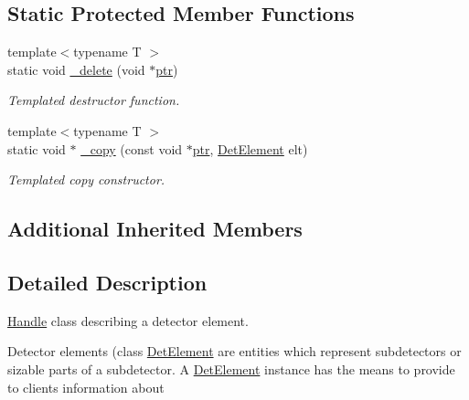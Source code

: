 \subsection*{Static Protected Member Functions}
\begin{DoxyCompactItemize}
\item 
{\footnotesize template$<$typename T $>$ }\\static void \hyperlink{class_d_d4hep_1_1_geometry_1_1_det_element_ae50e83aa675d0f3eae3cfed01a597bec}{\+\_\+delete} (void $\ast$\hyperlink{class_d_d4hep_1_1_handle_a6f165a9eec329d2d65172767b5f2777a}{ptr})
\begin{DoxyCompactList}\small\item\em Templated destructor function. \end{DoxyCompactList}\item 
{\footnotesize template$<$typename T $>$ }\\static void $\ast$ \hyperlink{class_d_d4hep_1_1_geometry_1_1_det_element_a2098e1c10dc049af5040b380d2af1983}{\+\_\+copy} (const void $\ast$\hyperlink{class_d_d4hep_1_1_handle_a6f165a9eec329d2d65172767b5f2777a}{ptr}, \hyperlink{class_d_d4hep_1_1_geometry_1_1_det_element}{Det\+Element} elt)
\begin{DoxyCompactList}\small\item\em Templated copy constructor. \end{DoxyCompactList}\end{DoxyCompactItemize}
\subsection*{Additional Inherited Members}


\subsection{Detailed Description}
\hyperlink{class_d_d4hep_1_1_handle}{Handle} class describing a detector element. 

Detector elements (class \hyperlink{class_d_d4hep_1_1_geometry_1_1_det_element}{Det\+Element} are entities which represent subdetectors or sizable parts of a subdetector. A \hyperlink{class_d_d4hep_1_1_geometry_1_1_det_element}{Det\+Element} instance has the means to provide to clients information about


